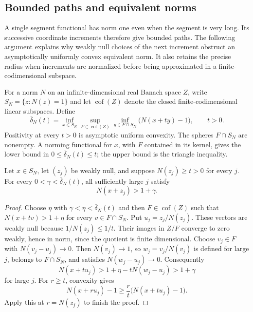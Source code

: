 \subsection{Bounded paths and equivalent norms}

A single segment functional has norm one even when the segment is very
long. Its successive coordinate increments therefore give bounded
paths. The following argument explains why weakly null choices of the
next increment obstruct an asymptotically uniformly convex equivalent
norm. It also retains the precise radius when increments are normalized
before being approximated in a finite-codimensional subspace.

For a norm $N$ on an infinite-dimensional real Banach space $Z$, write
$S_N=\{z:N(z)=1\}$ and let $\operatorname{cof}(Z)$ denote the closed
finite-codimensional linear subspaces. Define
\begin{equation}\label{eq:one-sided-modulus}
 \overline\delta_N(t)=\inf_{x\in S_N}
   \sup_{F\in\operatorname{cof}(Z)}
   \inf_{y\in F\cap S_N}\bigl(N(x+ty)-1\bigr),\qquad t>0.
\end{equation}
Positivity at every $t>0$ is asymptotic uniform convexity.
The spheres $F\cap S_N$ are nonempty. A norming functional for $x$,
with $F$ contained in its kernel, gives the lower bound in
$0\le\overline\delta_N(t)\le t$; the upper bound is the triangle
inequality.

\begin{lemma}\label{foundation:weak-null-growth}
Let $x\in S_N$, let $(z_j)$ be weakly null, and suppose $N(z_j)\ge t>0$
for every $j$. For every
$0<\gamma<\overline\delta_N(t)$, all sufficiently large $j$ satisfy
\[
 N(x+z_j)>1+\gamma.
\]
\end{lemma}
\begin{proof}
Choose $\eta$ with $\gamma<\eta<\overline\delta_N(t)$ and then
$F\in\operatorname{cof}(Z)$ such that
$N(x+tv)>1+\eta$ for every $v\in F\cap S_N$.
Put $u_j=z_j/N(z_j)$. These vectors are weakly null because
$1/N(z_j)\le1/t$. Their images in $Z/F$ converge to zero weakly,
hence in norm, since the quotient is finite dimensional. Choose
$v_j\in F$ with $N(v_j-u_j)\to0$. Then $N(v_j)\to1$, so
$w_j=v_j/N(v_j)$ is defined for large $j$, belongs to $F\cap S_N$,
and satisfies $N(w_j-u_j)\to0$. Consequently
\[
 N(x+t u_j)>1+\eta-tN(w_j-u_j)>1+\gamma
\]
for large $j$. For $r\ge t$, convexity gives
\[
 N(x+r u_j)-1\ge\frac rt\bigl(N(x+t u_j)-1\bigr).
\]
Apply this at $r=N(z_j)$ to finish the proof.
\end{proof}

